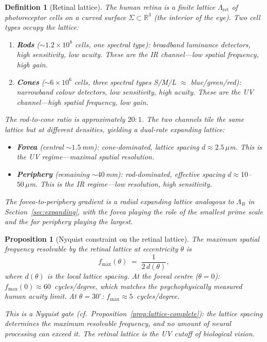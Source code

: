 \documentclass[11pt,a4paper]{article}
\newtheorem{proposition}[theorem]{Proposition}
\newtheorem{definition}[theorem]{Definition}
\newcommand{\R}{\mathbb{R}}
\begin{document}
\begin{definition}[Retinal lattice]\label{def:retinal-lattice}
The human retina is a finite lattice $\Lambda_{\mathrm{ret}}$
of photoreceptor cells on a curved surface $\Sigma \subset \R^3$
(the interior of the eye).
Two cell types occupy the lattice:
\begin{enumerate}[nosep]
\item \textbf{Rods}
  ($\sim\!1.2 \times 10^8$ cells, one spectral type):
  broadband luminance detectors, high sensitivity, low acuity.
  These are the \emph{IR channel}---low spatial frequency,
  high gain.

\item \textbf{Cones}
  ($\sim\!6 \times 10^6$ cells, three spectral types
  S/M/L $\approx$ blue/green/red):
  narrowband colour detectors, low sensitivity, high acuity.
  These are the \emph{UV channel}---high spatial frequency,
  low gain.
\end{enumerate}
The rod-to-cone ratio is approximately $20{:}1$.
The two channels tile the same lattice but at different
densities, yielding a \emph{dual-rate expanding lattice}:
\begin{itemize}[nosep]
\item \textbf{Fovea} (central $\sim\!1.5$\,mm):
  cone-dominated, lattice spacing $d \approx 2.5\,\mu$m.
  This is the UV regime---maximal spatial resolution.
\item \textbf{Periphery} (remaining $\sim\!40$\,mm):
  rod-dominated, effective spacing $d \approx 10$--$50\,\mu$m.
  This is the IR regime---low resolution, high sensitivity.
\end{itemize}
The fovea-to-periphery gradient is a radial expanding lattice
analogous to $\Lambda_R$ in
Section~\ref{sec:expanding}, with the fovea playing the
role of the smallest prime scale and the far periphery
playing the largest.
\end{definition}

\begin{proposition}[Nyquist constraint on the retinal lattice]%
\label{prop:retina-nyquist}
The maximum spatial frequency resolvable by the retinal
lattice at eccentricity $\theta$ is
\[
  f_{\max}(\theta)
    \;=\; \frac{1}{2\,d(\theta)},
\]
where $d(\theta)$ is the local lattice spacing.
At the foveal centre ($\theta = 0$):
$f_{\max}(0) \approx 60$~cycles/degree,
which matches the psychophysically measured human acuity
limit.
At $\theta = 30^\circ$:
$f_{\max} \approx 5$~cycles/degree.

This is a Nyquist gate
(cf.\ Proposition~\ref{prop:lattice-complete}):
the lattice spacing determines the maximum resolvable
frequency, and no amount of neural processing can exceed it.
The retinal lattice \emph{is} the UV cutoff of biological
vision.
\end{proposition}
\end{document}
